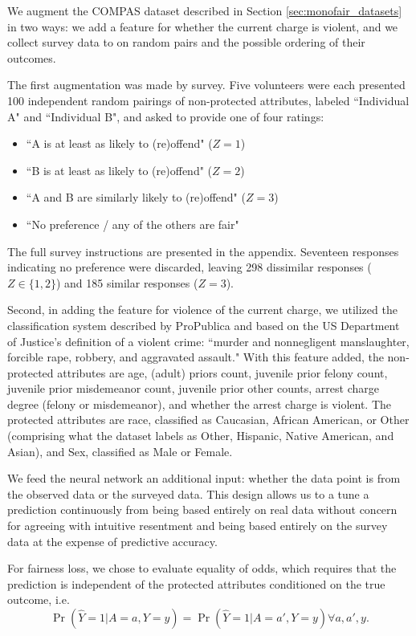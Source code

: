         We augment the COMPAS dataset described in Section \ref{sec:monofair_datasets} in two ways: we add a feature for whether the current charge is violent, and we collect survey data to on random pairs and the possible ordering of their outcomes.
        
        The first augmentation was made by survey.  Five volunteers were each presented 100 independent random pairings of non-protected attributes, labeled ``Individual A" and ``Individual B", and asked to provide one of four ratings:
        \begin{itemize}
            \item ``A is at least as likely to (re)offend" ($Z = 1$)
            \item ``B is at least as likely to (re)offend" ($Z = 2$)
            \item ``A and B are similarly likely to (re)offend" ($Z = 3$)
            \item ``No preference / any of the others are fair"
        \end{itemize}
        The full survey instructions are presented in the appendix.  Seventeen responses indicating no preference were discarded, leaving 298 dissimilar responses ($Z \in \{1, 2\}$) and 185 similar responses ($Z = 3$).

        Second, in adding the feature for violence of the current charge, we utilized the classification system described by ProPublica and based on the US Department of Justice's definition of a violent crime: ``murder and nonnegligent manslaughter, forcible rape, robbery, and aggravated assault."  With this feature added, the non-protected attributes are age, (adult) priors count, juvenile prior felony count, juvenile prior misdemeanor count, juvenile prior other counts, arrest charge degree (felony or misdemeanor), and whether the arrest charge is violent.  The protected attributes are race, classified as Caucasian, African American, or Other (comprising what the dataset labels as Other, Hispanic, Native American, and Asian), and Sex, classified as Male or Female.
        
        We feed the neural network an additional input: whether the data point is from the observed data or the surveyed data.  This design allows us to a tune a prediction continuously from being based entirely on real data without concern for agreeing with intuitive resentment and being based entirely on the survey data at the expense of predictive accuracy.
        
        For fairness loss, we chose to evaluate equality of odds, which requires that the prediction is independent of the protected attributes conditioned on the true outcome, i.e.
        $$ \Pr(\hat{Y} = 1 | A = a, Y = y) = \Pr(\hat{Y} = 1 | A = a', Y = y) \forall a, a', y .$$
        
